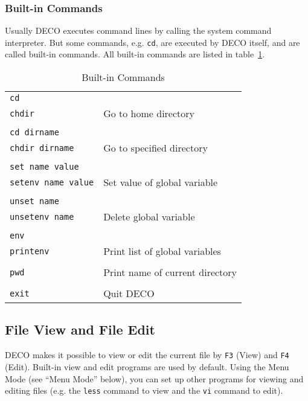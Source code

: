 \subsubsection{Built-in Commands}

Usually DECO executes command lines by calling the system command
interpreter.  But some commands, e.g. {\tt cd},
are executed by DECO itself, and are called built-in commands.
All built-in commands are listed in table~\ref{builtin}.

\begin{table}[bp]
\begin{center}
\begin{tabular}{|ll|}
\hline
{\tt cd} & \\
{\tt chdir} & Go to home directory \\
& \\
{\tt cd dirname} & \\
{\tt chdir dirname} & Go to specified directory \\
& \\
{\tt set name value} & \\
{\tt setenv name value} & Set value of global variable \\
& \\
{\tt unset name} & \\
{\tt unsetenv name} & Delete global variable \\
& \\
{\tt env} & \\
{\tt printenv} & Print list of global variables \\
& \\
{\tt pwd} & Print name of current directory \\
& \\
{\tt exit} & Quit DECO \\
\hline
\end{tabular}
\caption{Built-in Commands}
\label{builtin}
\end{center}
\end{table}

\subsection{File View and File Edit}

DECO makes it possible to view or edit the current file 
by {\tt F3} (View) and {\tt F4} (Edit). Built-in view and edit
programs are used by default. Using the Menu Mode 
(see ``Menu Mode'' below), you can set up other
programs for viewing and editing files (e.g. the
{\tt less} command to view and the {\tt vi} command to edit).

